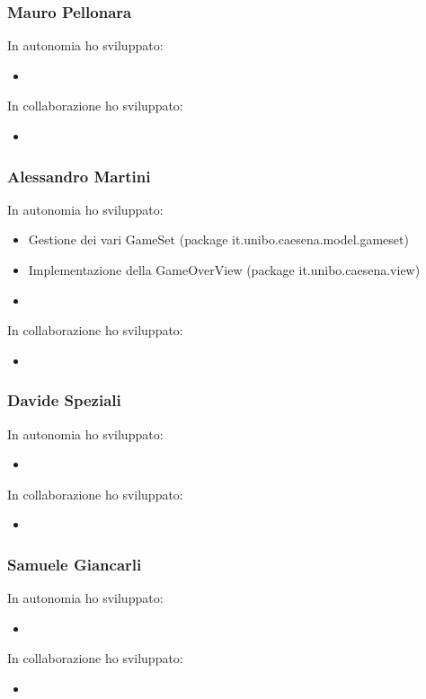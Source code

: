 \subsubsection*{Mauro Pellonara} 
In autonomia ho sviluppato:
\begin{itemize}
    \item 
\end{itemize}
In collaborazione ho sviluppato:
\begin{itemize}
    \item 
\end{itemize}

\subsubsection*{Alessandro Martini}
In autonomia ho sviluppato:
\begin{itemize}
    \item Gestione dei vari GameSet (package it.unibo.caesena.model.gameset)
    \item Implementazione della GameOverView (package it.unibo.caesena.view)
    \item 
\end{itemize}
In collaborazione ho sviluppato:
\begin{itemize}
    \item 
\end{itemize}

\subsubsection*{Davide Speziali}
In autonomia ho sviluppato:
\begin{itemize}
    \item 
\end{itemize}
In collaborazione ho sviluppato:
\begin{itemize}
    \item 
\end{itemize}

\subsubsection*{Samuele Giancarli}
In autonomia ho sviluppato:
\begin{itemize}
    \item 
\end{itemize}
In collaborazione ho sviluppato:
\begin{itemize}
    \item 
\end{itemize}

